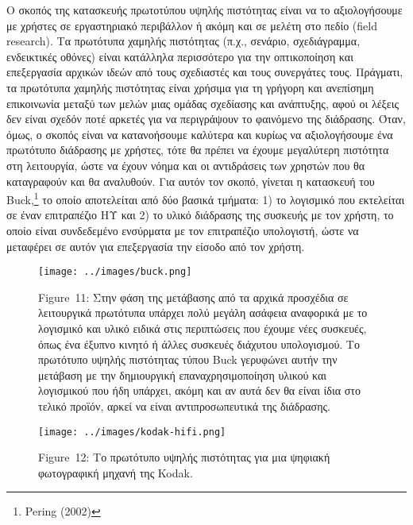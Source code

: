 \documentclass[
]{article}
\begin{document}
Ο σκοπός της κατασκευής πρωτοτύπου υψηλής πιστότητας είναι να το
αξιολογήσουμε με χρήστες σε εργαστηριακό περιβάλλον ή ακόμη και σε
μελέτη στο πεδίο (field research). Τα πρωτότυπα χαμηλής πιστότητας
(π.χ., σενάριο, σχεδιάγραμμα, ενδεικτικές οθόνες) είναι κατάλληλα
περισσότερο για την οπτικοποίηση και επεξεργασία αρχικών ιδεών από τους
σχεδιαστές και τους συνεργάτες τους. Πράγματι, τα πρωτότυπα χαμηλής
πιστότητας είναι χρήσιμα για τη γρήγορη και ανεπίσημη επικοινωνία μεταξύ
των μελών μιας ομάδας σχεδίασης και ανάπτυξης, αφού οι λέξεις δεν είναι
σχεδόν ποτέ αρκετές για να περιγράψουν το φαινόμενο της διάδρασης. Όταν,
όμως, ο σκοπός είναι να κατανοήσουμε καλύτερα και κυρίως να
αξιολογήσουμε ένα πρωτότυπο διάδρασης με χρήστες, τότε θα πρέπει να
έχουμε μεγαλύτερη πιστότητα στη λειτουργία, ώστε να έχουν νόημα και οι
αντιδράσεις των χρηστών που θα καταγραφούν και θα αναλυθούν. Για αυτόν
τον σκοπό, γίνεται η κατασκευή του Buck,\footnote{Pering (2002)} το
οποίο αποτελείται από δύο βασικά τμήματα: 1) το λογισμικό που εκτελείται
σε έναν επιτραπέζιο ΗΥ και 2) το υλικό διάδρασης της συσκευής με τον
χρήστη, το οποίο είναι συνδεδεμένο ενσύρματα με τον επιτραπέζιο
υπολογιστή, ώστε να μεταφέρει σε αυτόν για επεξεργασία την είσοδο από
τον χρήστη.

\leavevmode{}%
\begin{figure}
\hypertarget{fig:buck}{%
\centering
\texttt{[image: ../images/buck.png]}
\caption{Figure~11: Στην φάση της μετάβασης από τα αρχικά προσχέδια σε
λειτουργικά πρωτότυπα υπάρχει πολύ μεγάλη ασάφεια αναφορικά με το
λογισμικό και υλικό ειδικά στις περιπτώσεις που έχουμε νέες συσκευές,
όπως ένα έξυπνο κινητό ή άλλες συσκευές διάχυτου υπολογισμού. Το
πρωτότυπο υψηλής πιστότητας τύπου Buck γερυφώνει αυτήν την μετάβαση με
την δημιουργική επαναχρησιμοποίηση υλικού και λογισμικού που ήδη
υπάρχει, ακόμη και αν αυτά δεν θα είναι ίδια στο τελικό προϊόν, αρκεί να
είναι αντιπροσωπευτικά της διάδρασης.}\label{fig:buck}
}
\end{figure}

\leavevmode{}%
\begin{figure}
\hypertarget{fig:kodak-hifi}{%
\centering
\texttt{[image: ../images/kodak-hifi.png]}
\caption{Figure~12: Το πρωτότυπο υψηλής πιστότητας για μια ψηφιακή
φωτογραφική μηχανή της Kodak.}\label{fig:kodak-hifi}
}
\end{figure}
\end{document}
